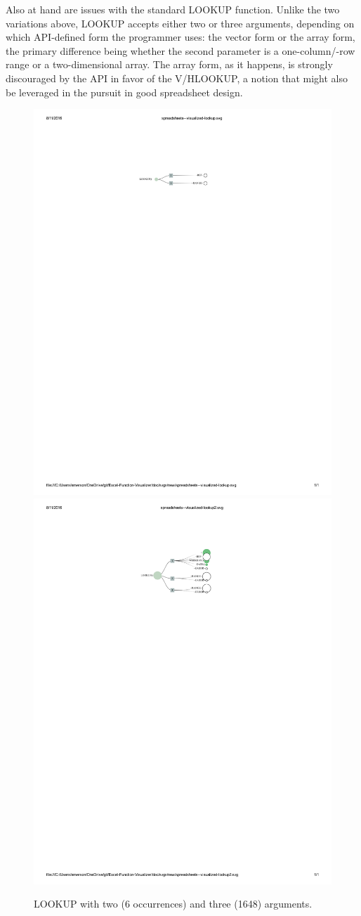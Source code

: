 \documentclass[conference]{IEEEtran}
\begin{document}
	Also at hand are issues with the standard LOOKUP function. Unlike the two 
	variations above, LOOKUP accepts either two or three arguments, depending
	on which API-defined form the programmer uses: the vector form or
	the array form, the primary difference being whether the second parameter
	is a one-column/-row range or a two-dimensional array. The array form, as 
	it happens, is strongly discouraged by the API in favor of the V/HLOOKUP,
	a notion that might also be leveraged in the pursuit in good spreadsheet 
	design.
	
	\begin{figure}
		\centering
		\includegraphics[width=.5\textwidth]{lookup-2}
		\includegraphics[width=.5\textwidth]{lookup-3}
		\label{"fig:lookups"}
		\caption{LOOKUP with two (6 occurrences) and three (1648) arguments.}
	\end{figure}
	
\end{document}
